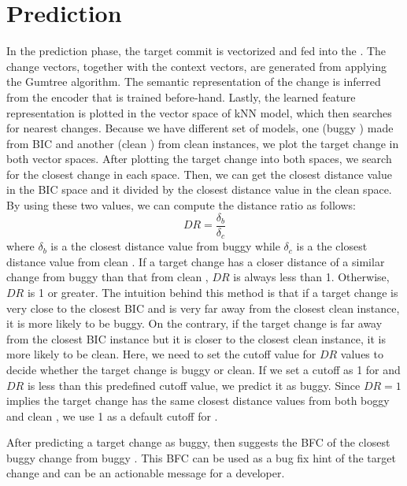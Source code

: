 \section{Prediction}
In the prediction phase, the target commit is vectorized and fed into the {\simfin}.
The change vectors, together with the context vectors, are generated from applying the Gumtree algorithm.
The semantic representation of the change is inferred from the encoder that is trained before-hand.
Lastly, the learned feature representation is plotted in the vector space of kNN model, which then searches for nearest changes.
Because we have different set of models, one (buggy \simfin) made from BIC and another (clean \simfin) from clean instances, we plot the target change in both vector spaces.
After plotting the target change into both spaces, we search for the closest change in each space.
Then, we can get the closest distance value in the BIC space and it divided by the closest distance value in the clean space.
By using these two values, we can compute the distance ratio as follows:
\begin{equation}
    DR = \frac{\delta_b}{\delta_c}
\end{equation}
where $\delta_b$ is a the closest distance value from buggy \simfin while $\delta_c$ is a the closest distance value from clean \simfin.
If a target change has a closer distance of a similar change from buggy \simfin than that from clean \simfin, $DR$ is always less than 1. Otherwise, $DR$ is 1 or greater.
The intuition behind this method is that if a target change is very close to the closest BIC and is very far away from the closest clean instance, it is more likely to be buggy.
On the contrary, if the target change is far away from the closest BIC instance but it is closer to the closest clean instance, it is more likely to be clean.
Here, we need to set the cutoff value for $DR$ values to decide whether the target change is buggy or clean.
If we set a cutoff as 1 for \simfinmo and $DR$ is less than this predefined cutoff value, we predict it as buggy.
Since $DR=1$ implies the target change has the same closest distance values from both boggy and clean \simfin, we use 1 as a default cutoff for \simfinmo.

After predicting a target change as buggy, then \simfinmo suggests the BFC of the closest buggy change from buggy \simfin.
This BFC can be used as a bug fix hint of the target change and can be an actionable message for a developer.